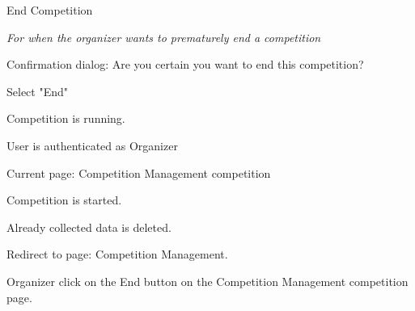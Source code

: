 
\begin{uc}{End Competition}

    \emph{For when the organizer wants to prematurely end a competition}

    \begin{uc-mss}
    \item Confirmation dialog: Are you certain you want to end this competition?
    \item Select "End"
    \end{uc-mss}

    \begin{uc-pre}
    \item Competition is running.
    \item User is authenticated as Organizer
    \item Current page: Competition Management {competition}
    \end{uc-pre}

    \begin{uc-post}
    \item Competition is started.
    \item Already collected data is deleted.
    \item Redirect to page: Competition Management.
    \end{uc-post}

    \begin{uc-trig}
        Organizer click on the End button on the Competition Management {competition} page.
    \end{uc-trig}

\end{uc}
